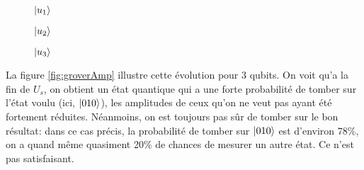 \begin{figure*}[h]
  \centering
  \begin{subfigure}[t]{0.33\textwidth}
      \centering
      \caption{$\ket{u_1}$}
  \end{subfigure}%
  \begin{subfigure}[t]{0.33\textwidth}
      \centering
      \caption{$\ket{u_2}$}
  \end{subfigure}
  \begin{subfigure}[t]{0.33\textwidth}
    \centering
    \caption{$\ket{u_3}$}
  \end{subfigure}
  \caption{Evolution des amplitudes pour $n=3$ qubits}
  \label{fig:groverAmp}
\end{figure*}

La figure \ref{fig:groverAmp} illustre cette évolution pour 3 qubits. On voit qu'a la fin de $U_s$, on obtient un état quantique qui a une forte probabilité de tomber sur l'état voulu (ici, $\ket{010}$), les amplitudes de ceux qu'on ne veut pas ayant été fortement réduites. Néanmoins, on est toujours pas sûr de tomber sur le bon résultat: dans ce cas précis, la probabilité de tomber sur $\ket{010}$ est d'environ 78\%, on a quand même quasiment 20\% de chances de mesurer un autre état. Ce n'est pas satisfaisant.

